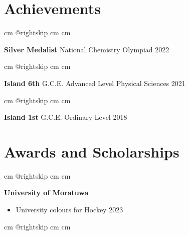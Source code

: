 \documentclass[10pt, a4paper]{article}
\newenvironment{highlights}{
        \begin{itemize}[
                topsep=0pt,
                parsep=0.10 cm,
                partopsep=0pt,
                itemsep=0pt,
                after=\vspace{-1\baselineskip},
                leftmargin=0.4 cm + 3pt
            ]
    }{
        \end{itemize}
    } %
\begin{document}
    \section{Achievements}

        \begingroup{} cm
        \advance\csname @rightskip cm
        \advance{} cm

        \textbf{Silver Medalist} National Chemistry Olympiad 2022 \par\endgroup

        \vspace{0.2 cm}
        \begingroup{} cm
        \advance\csname @rightskip cm
        \advance{} cm

        \textbf{Island 6th} G.C.E. Advanced Level Physical Sciences 2021 \par\endgroup
        
         \vspace{0.2 cm}
        \begingroup{} cm
        \advance\csname @rightskip cm
        \advance{} cm

        \textbf{Island 1st} G.C.E. Ordinary Level 2018 \par\endgroup

    \section{Awards and Scholarships}

        \begingroup{} cm
        \advance\csname @rightskip cm
        \advance{} cm

        \textbf{University of Moratuwa}  \begin{highlights}
		\item University colours for Hockey 2023
	\end{highlights}
        \par\endgroup

        \vspace{0.6 cm}
        \begingroup{} cm
        \advance\csname @rightskip cm
        \advance{} cm
\end{document}
